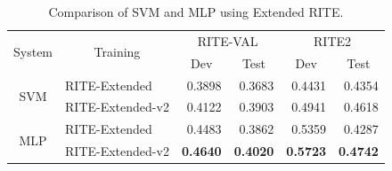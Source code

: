 \documentclass[12pt]{article}
\begin{document}
\begin{CJK*}{UTF8}{bkai}
\begin{spacing}{1.77}
\begin{table}[H]
  \centering
  \setlength{\extrarowheight}{-3pt}
  \caption{Comparison of SVM and MLP using Extended RITE.}
  \label{result:ml_expand}
  \begin{tabular}{|c|l|r|r|r|r|}
  \hline
  \multirow{2}{*}{System} & \multicolumn{1}{c|}{\multirow{2}{*}{Training}} & \multicolumn{2}{c|}{RITE-VAL} & \multicolumn{2}{c|}{RITE2} \\ \cline{3-6}
   & \multicolumn{1}{c|}{} & \multicolumn{1}{c|}{Dev} & \multicolumn{1}{c|}{Test} & \multicolumn{1}{c|}{Dev} & \multicolumn{1}{c|}{Test} \\ \hline
  \multirow{2}{*}{SVM} & RITE-Extended & 0.3898 & 0.3683 & 0.4431 & 0.4354 \\ \cline{2-6}
   & RITE-Extended-v2 & 0.4122 & 0.3903 & 0.4941 & 0.4618 \\ \hline
  \multirow{2}{*}{MLP} & RITE-Extended & 0.4483 & 0.3862 & 0.5359 & 0.4287 \\ \cline{2-6}
   & RITE-Extended-v2 & \textbf{0.4640} & \textbf{0.4020} & \textbf{0.5723} & \textbf{0.4742} \\ \hline
  \end{tabular}
\end{table}


\end{spacing}
\end{CJK*}
\end{document}

